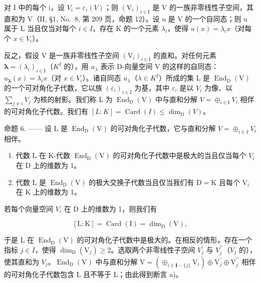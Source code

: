 对 I 中的每个 i，设 \(V_{i} = \varepsilon_{i}(V)\)；则 \((\mathrm{V}_{i})_{i \in \mathrm{I}}\) 是 V 的一族非零线性子空间，其直和为 V（II, §1, No.~8, 第 209 页，命题 12）。设 u 是 V 的一个自同态；则 u 属于 L 当且仅当对每个 \(i \in I\)，存在 K 的一个元素 \(\lambda_{i}\)，使得 \(u(x) = \lambda_{i}x\)（对每个 \(x \in V_{i}\)）。

反之，假设 V 是一族非零线性子空间 \((\mathrm{V}_{i})_{i\in\mathrm{I}}\) 的直和。对任何元素 \(\boldsymbol{\lambda}=(\lambda_{i})_{i\in\mathrm{I}}\)（\(K^{I}\) 的），用 \(u_{\lambda}\) 表示 D-向量空间 V 的这样的自同态：\(u_{\boldsymbol{\lambda}}(x)=\lambda_{i}x\)（对 \(x\in V_{i}\)）。诸自同态 \(u_{\lambda}\)（\(\lambda\in K^{I}\)）所成的集 L 是 \(\operatorname{End}_{\mathrm{D}}(\mathrm{V})\) 的一个可对角化子代数，它以族 \((\varepsilon_{i})_{i\in\mathrm{I}}\) 为基，其中 \(\varepsilon_{i}\) 是以 \(V_{i}\) 为像、以 \(\sum_{j\neq i}V_{j}\) 为核的射影。我们称 L 为 \(\operatorname{End}_{\mathrm{D}}(\mathrm{V})\) 中与直和分解 \(V=\oplus_{i\in\mathrm{I}}V_{i}\) 相伴的可对角化子代数。我们有 \([L:K]=\operatorname{Card}(I)\leqslant\dim_{\mathrm{D}}(V)\)。

命题 6. —— 设 L 是 \(\operatorname{End}_{\mathrm{D}}(\mathrm{V})\) 的可对角化子代数，它与直和分解 \(V = \oplus_{i \in I} V_i\) 相伴。

\begin{enumerate}
\def\labelenumi{\alph{enumi})}
\item
  代数 L 在 K-代数 \(\operatorname{End}_{\mathrm{D}}(\mathrm{V})\) 的可对角化子代数中是极大的当且仅当每个 \(V_{i}\) 在 D 上的维数为 1。
\item
  代数 \(\mathrm{L}\) 是 \(\operatorname{End}_{\mathrm{D}}(\mathrm{V})\) 的极大交换子代数当且仅当我们有 \(\mathrm{D} = \mathrm{K}\) 且每个 \(\mathrm{V}_i\) 在 \(\mathrm{K}\) 上的维数为 1。
\end{enumerate}

若每个向量空间 \(V_{i}\) 在 D 上的维数为 1，则我们有

\[
[ \mathrm{L}: \mathrm{K} ] = \operatorname{Card} (\mathrm{I}) = \dim_ {\mathrm{D}} (\mathrm{V}),
\]

于是 L 在 \(\operatorname{End}_{\mathrm{D}}(\mathrm{V})\) 的可对角化子代数中是极大的。在相反的情形，存在一个指标 \(j \in I\)，使得 \(\dim_{\mathrm{D}}(\mathrm{V}_{j}) \geqslant 2\)。选取两个非零线性子空间 \(V_{j}^{\prime}\) 与 \(V_{j}^{\prime\prime}\)（\(V_{j}\) 的），使其直和为 \(V_{j}\)。\(\operatorname{End}_{\mathrm{D}}(\mathrm{V})\) 中与直和分解 \(\mathrm{V} = (\oplus_{i \in \mathbf{I} - \{j\}} \mathrm{V}_{i}) \oplus \mathrm{V}_{j}^{\prime} \oplus \mathrm{V}_{j}^{\prime\prime}\) 相伴的可对角化子代数包含 L 且不等于 L；由此得到断言 a)。

